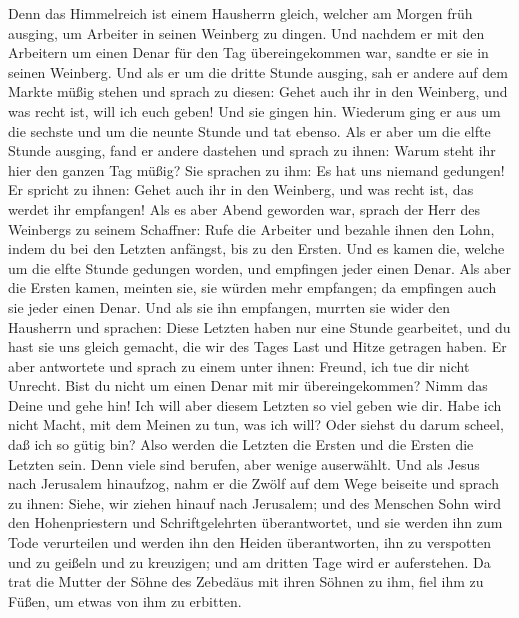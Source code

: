  Denn das Himmelreich ist einem Hausherrn gleich, welcher
am Morgen früh ausging, um Arbeiter in seinen Weinberg zu dingen.
 Und nachdem er mit den Arbeitern um einen Denar für den
Tag übereingekommen war, sandte er sie in seinen Weinberg.
 Und als er um die dritte Stunde ausging, sah er andere
auf dem Markte müßig stehen  und sprach zu diesen: Gehet
auch ihr in den Weinberg, und was recht ist, will ich euch geben!
 Und sie gingen hin. Wiederum ging er aus um die sechste
und um die neunte Stunde und tat ebenso.  Als er aber um
die elfte Stunde ausging, fand er andere dastehen und sprach zu ihnen:
Warum steht ihr hier den ganzen Tag müßig?  Sie sprachen
zu ihm: Es hat uns niemand gedungen! Er spricht zu ihnen: Gehet auch ihr
in den Weinberg, und was recht ist, das werdet ihr empfangen!
 Als es aber Abend geworden war, sprach der Herr des
Weinbergs zu seinem Schaffner: Rufe die Arbeiter und bezahle ihnen den
Lohn, indem du bei den Letzten anfängst, bis zu den Ersten.
 Und es kamen die, welche um die elfte Stunde gedungen
worden, und empfingen jeder einen Denar.  Als aber die
Ersten kamen, meinten sie, sie würden mehr empfangen; da empfingen auch
sie jeder einen Denar.  Und als sie ihn empfangen,
murrten sie wider den Hausherrn  und sprachen: Diese
Letzten haben nur eine Stunde gearbeitet, und du hast sie uns gleich
gemacht, die wir des Tages Last und Hitze getragen haben.
 Er aber antwortete und sprach zu einem unter ihnen:
Freund, ich tue dir nicht Unrecht. Bist du nicht um einen Denar mit mir
übereingekommen?  Nimm das Deine und gehe hin! Ich will
aber diesem Letzten so viel geben wie dir.  Habe ich
nicht Macht, mit dem Meinen zu tun, was ich will? Oder siehst du darum
scheel, daß ich so gütig bin?  Also werden die Letzten
die Ersten und die Ersten die Letzten sein. Denn viele sind berufen,
aber wenige auserwählt.  Und als Jesus nach Jerusalem
hinaufzog, nahm er die Zwölf auf dem Wege beiseite und sprach zu ihnen:
 Siehe, wir ziehen hinauf nach Jerusalem; und des
Menschen Sohn wird den Hohenpriestern und Schriftgelehrten
überantwortet, und sie werden ihn zum Tode verurteilen 
und werden ihn den Heiden überantworten, ihn zu verspotten und zu
geißeln und zu kreuzigen; und am dritten Tage wird er auferstehen.
 Da trat die Mutter der Söhne des Zebedäus mit ihren
Söhnen zu ihm, fiel ihm zu Füßen, um etwas von ihm zu erbitten.

